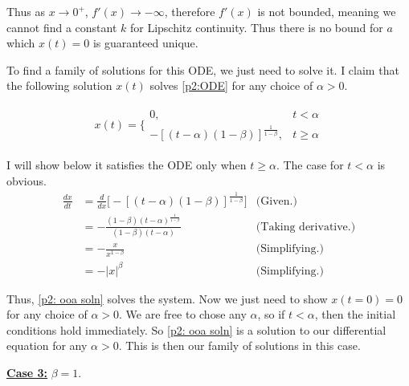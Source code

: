 \begin{solution}
    Thus as $x \rightarrow 0^+$, $f'(x) \rightarrow -\infty$, therefore $f'(x)$ is not bounded, meaning we cannot find a constant $k$ for Lipschitz continuity. Thus there is no bound for $a$ which $x(t) = 0$ is guaranteed unique.

    \jump
    To find a family of solutions for this ODE, we just need to solve it. I claim that the following solution $x(t)$ solves \ref{p2:ODE} for any choice of $\alpha > 0$.

    \begin{align}
        x(t) = 
        \Bigg\{\begin{array}{lr}
             0, &t < \alpha\\
             -[(t - \alpha)(1 - \beta)]^{\frac{1}{1 - \beta}}, &t \geq \alpha
        \end{array}
        \label{p2: ooa soln}
    \end{align}

    I will show below it satisfies the ODE only when $t \geq \alpha$. The case for $t < \alpha$ is obvious. 
    \alignbreak
    \begin{align}
        \frac{dx}{dt} &= \frac{d}{dx}\Bigg[ -[ (t - \alpha)(1 - \beta)] ^{\frac{1}{1-\beta}}\Bigg] &\text{(Given.)}\nonumber\\
        &= -\frac{(1 - \beta)(t - \alpha)^{\frac{1}{1 - \beta}}}{(1 - \beta)(t - \alpha)}   &\text{(Taking derivative.)}\nonumber\\
        &= -\frac{x}{x^{1 - \beta}} &\text{(Simplifying.)}\nonumber\\
        &= -|x|^\beta &\text{(Simplifying.)}\nonumber
    \end{align}
    \alignbreak
    
    Thus, \ref{p2: ooa soln} solves the system. Now we just need to show $x(t = 0) = 0$ for any choice of $\alpha > 0$. We are free to chose any $\alpha$, so if $t < \alpha$, then the initial conditions hold immediately. So \ref{p2: ooa soln} is a solution to our differential equation for any $\alpha > 0$. This is then our family of solutions in this case.  

    \newpage
    \jump
    \underline{\textbf{Case 3:}} $\beta = 1$.
    \jump


\end{solution}

